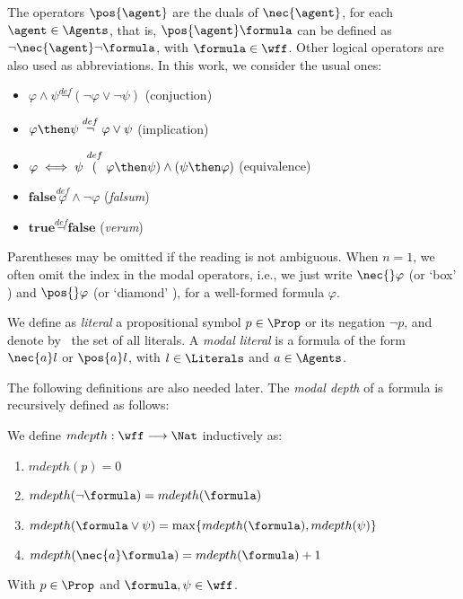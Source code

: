 The operators $\pos{\agent}$ are the duals of $\nec{\agent}$, for each $\agent \in
\Agents$, that is, $\pos{\agent} \formula$ can be defined as $\neg \nec{\agent} \neg
\formula$, with $\formula \in \wff$. Other logical operators are also used as abbreviations.
In this work, we consider the usual ones:
\begin{itemize}
    \item $\varphi \wedge \psi \stackrel{def} \neg(\neg \varphi \lor \neg \psi)$ (conjuction)
    \item $\varphi \then \psi \stackrel{def} \neg \varphi \lor \psi$ (implication)
    \item $\varphi \iff \psi \stackrel{def} (\varphi \then \psi) \land (\psi \then \varphi)$ (equivalence)
    \item $\textbf{false} \stackrel{def} \varphi \wedge \neg \varphi$ (\emph{falsum})
    \item $ \textbf{true} \stackrel{def} \neg \textbf{false}$ (\emph{verum}) 
\end{itemize}

Parentheses may be omitted if the reading is not ambiguous.  When $n = 1$, we
often omit the index in the modal operators, i.e., we just write $\nec{}
\varphi$ (or `box' \formula) and $\pos{}\varphi$ (or `diamond' \formula), for a
well-formed formula $\varphi$. 

We define as \emph{literal} a propositional symbol $p \in \Prop$ or its negation $\neg
p$, and denote by \Literals~the set of all literals. A \emph{modal literal} is a
formula of the form $\nec{a} l$ or $\pos{a} l$, with $l \in \Literals$ and $a
\in \Agents$.

The following definitions are also needed later. The
\emph{modal depth} of a formula is recursively defined as follows:

\begin{definition}
    We define $mdepth : \wff \longrightarrow \Nat$ inductively as:
    \begin{enumerate}
        \item $mdepth(p) = 0$ 
        \item $mdepth(\neg \formula) = mdepth(\formula)$
        \item $mdepth(\formula \lor \psi) = \max\{mdepth(\formula), mdepth(\psi)\}$
        \item $mdepth(\nec{a} \formula) = mdepth(\formula) + 1$
    \end{enumerate}
    With $p \in \Prop$ and $\formula, \psi \in \wff$.
\end{definition}

